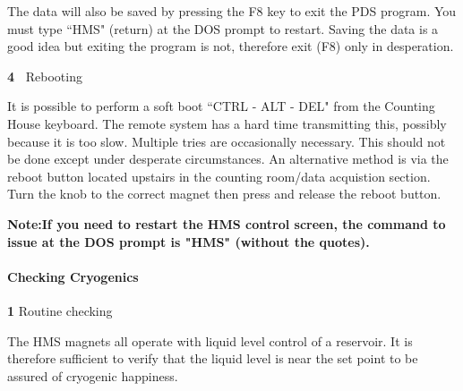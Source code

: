 {\begin{obsolete}
\begin{description}
\item{}\hskip0.3in The data will also be saved by pressing the F8 key to
exit the
PDS program. You must type ``HMS" (return) at the DOS prompt to restart.
Saving the data is a good idea but exiting the program is not,
therefore exit (F8) only in desperation.
\item{\bf 4~}\hskip0.1in Rebooting
\item{}\hskip0.3in It is possible to perform a soft boot ``CTRL - ALT - DEL"
from the Counting House keyboard.  The remote system has a hard time
transmitting this, possibly because it is too slow.  Multiple tries are
occasionally necessary.  This should not be done except under desperate
circumstances.
An alternative method is via the reboot button located upstairs in
the counting room/data acquistion section.  Turn the knob to the
correct magnet then press and release the reboot button.

\item{}\hskip0.3in {\bf Note:If you need to restart the HMS control screen, the command to issue at the DOS
prompt is "HMS" (without the quotes).}


\end{description}
\end{obsolete}

\paragraph{Checking Cryogenics}

\begin{description}
\item{\bf 1}\hskip0.1in Routine checking
\item{}\hskip0.3in The HMS magnets all operate with liquid level control of a
reservoir. It is therefore sufficient to verify that the liquid level
is near the set point to be assured of cryogenic happiness.
\end{description}

}
